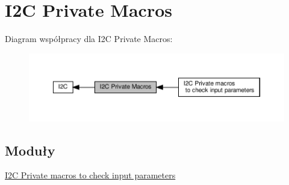 \hypertarget{group___i2_c___private___macros}{}\section{I2C Private Macros}
\label{group___i2_c___private___macros}
Diagram współpracy dla I2C Private Macros\+:\nopagebreak
\begin{figure}[H]
\begin{center}
\leavevmode
\includegraphics[width=350pt]{group___i2_c___private___macros}
\end{center}
\end{figure}
\subsection*{Moduły}
\begin{DoxyCompactItemize}
\item 
\hyperlink{group___i2_c___i_s___r_t_c___definitions}{I2\+C Private macros to check input parameters}
\end{DoxyCompactItemize}

